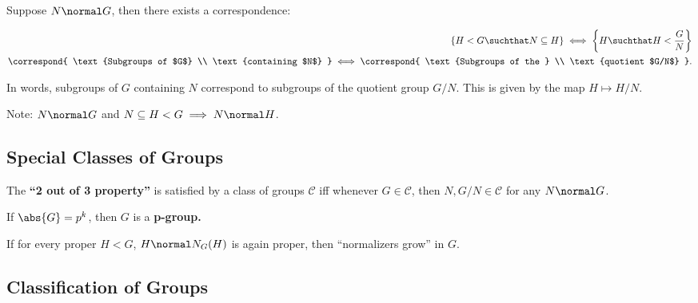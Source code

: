 \begin{theorem}

Suppose \(N \normal G\), then there exists a correspondence:

\begin{align*}
\left\{
H < G \suchthat N \subseteq H
\right\}
\iff
\left\{
H \suchthat H < \frac G N
\right\}
\\
\correspond{
  \text{Subgroups of $G$} \\
  \text{containing $N$}
} \iff
\correspond{
  \text{Subgroups of the } \\
  \text{quotient $G/N$}
}
.\end{align*}

In words, subgroups of \(G\) containing \(N\) correspond to subgroups of
the quotient group \(G/N\). This is given by the map \(H \mapsto H/N\).

\end{theorem}

Note: \(N \normal G\) and \(N \subseteq H < G \implies N \normal H\).

\hypertarget{special-classes-of-groups}{%
\subsection{Special Classes of Groups}\label{special-classes-of-groups}}

\begin{definition}

The \textbf{``2 out of 3 property''} is satisfied by a class of groups
\(\mathcal C\) iff whenever \(G \in \mathcal C\), then
\(N, G/N \in \mathcal{C}\) for any \(N \normal G\).

\end{definition}

\begin{definition}[p-groups]

If \(\abs{G} = p^k\), then \(G\) is a \textbf{p-group.}

\end{definition}

\begin{definition}

If for every proper \(H<G\), \(H\normal N_G(H)\) is again proper, then
``normalizers grow'' in \(G\).

\end{definition}

\hypertarget{classification-of-groups}{%
\subsection{Classification of Groups}\label{classification-of-groups}}

